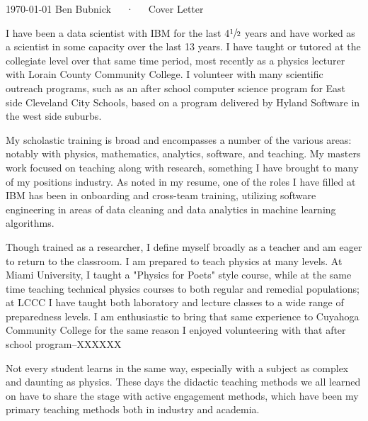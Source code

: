 \documentclass[11pt, a4paper]{awesome-cv}
\begin{document}
\makecvheader[R]

\makecvfooter
  {\today}
  {Ben Bubnick~~~·~~~Cover Letter}
  {}

\makelettertitle

\begin{cvletter}

I have been a data scientist with IBM for the last 4$\sfrac{1}{2}$ years and have worked as a scientist in some capacity over the last 13 years.  I have taught or tutored at the collegiate level over that same time period, most recently as a physics lecturer with Lorain County Community College.  I volunteer with many scientific outreach programs, such as an after school computer science program for East side Cleveland City Schools, based on a program delivered by Hyland Software in the west side suburbs.

My scholastic training is broad and encompasses a number of the various areas: notably with physics, mathematics, analytics, software, and teaching.  My masters work focused on teaching along with research, something I have brought to many of my positions industry.  As noted in my resume, one of the roles I have filled at IBM has been in onboarding and cross-team training, utilizing software engineering in areas of data cleaning and data analytics in machine learning algorithms.

Though trained as a researcher, I define myself broadly as a teacher and am eager to return to the classroom. I am prepared to teach physics at many levels.  At Miami University, I taught a "Physics for Poets" style course, while at the same time teaching technical physics courses to both regular and remedial populations; at LCCC I have taught both laboratory and lecture classes to a wide range of preparedness levels.  I am enthusiastic to bring that same experience to Cuyahoga Community College for the same reason I enjoyed volunteering with that after school program--XXXXXX

Not every student learns in the same way, especially with a subject as complex and daunting as physics.  These days the didactic teaching methods we all learned on have to share the stage with active engagement methods, which have been my primary teaching methods both in industry and academia.

\end{cvletter}


\makeletterclosing
\end{document}

